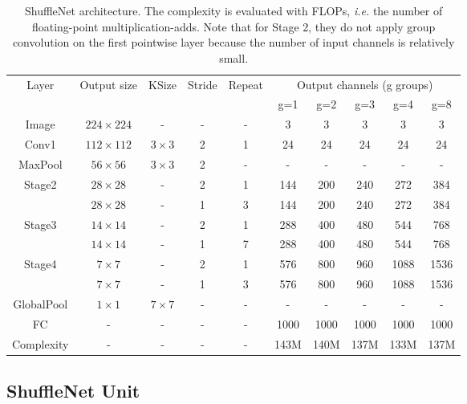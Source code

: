\documentclass[10pt,twocolumn,letterpaper]{article}
\begin{document}
\begin{table*}[tp]
	\caption{ShuffleNet architecture. The complexity is evaluated with FLOPs, \emph{i.e.} the number of floating-point multiplication-adds. Note that for Stage 2, they do not apply group convolution on the first pointwise layer because the number of input channels is relatively small.} \label{t1}
	\begin{center}
		\begin{tabular}{c|c|c|c|c| c c c c c}
			\hline
			Layer & Output size& KSize & Stride& Repeat & \multicolumn{5}{c}{Output channels (g groups)} \\
			& &  & &  & g=1 & g=2 & g=3 & g=4 & g=8\\
			\hline	\hline
			Image & $224\times 224$ & - &- &- & 3& 3& 3& 3& 3\\
			\hline
			Conv1 & $112\times 112$& $3\times 3$& 2& 1& 24& 24& 24& 24& 24\\
			MaxPool & $56\times 56$& $3\times 3$& 2&- &- & -&- & -&- \\
			\hline
			Stage2 & $28\times 28$&-  & 2& 1& 144& 200& 240& 272& 384\\
			& $28\times 28$&- & 1& 3& 144& 200& 240& 272& 384\\
			\hline
			Stage3 & $14\times 14$& - & 2& 1& 288& 400& 480& 544& 768\\
			& $14\times 14$&- & 1& 7& 288& 400& 480& 544& 768\\
			\hline
			Stage4 & $7\times 7$& - & 2& 1& 576& 800& 960& 1088& 1536\\
			& $7\times 7$& - & 1& 3& 576& 800& 960& 1088& 1536\\
			\hline
			GlobalPool & $1\times 1$& $7\times 7$ &- &- &- & -&- &- &- \\
			\hline
			FC &- &-  & -& -&1000 &1000 &1000 & 1000& 1000\\
			\hline\hline
			Complexity &- & - &- &- &143M &140M &137M & 133M&137M\\
			\hline
		\end{tabular}
	\end{center}
\end{table*}

\subsection{ShuffleNet Unit}
\end{document}
